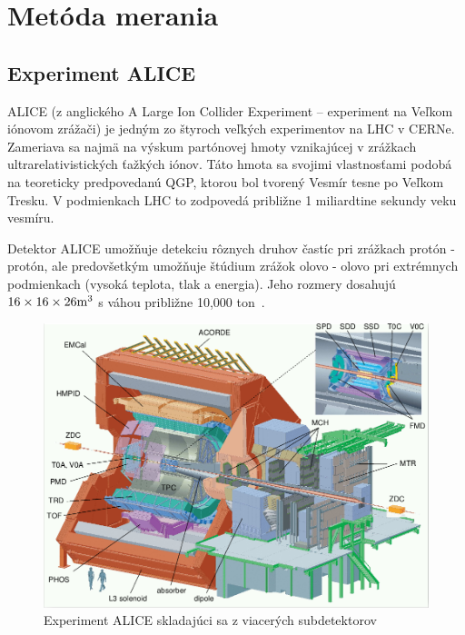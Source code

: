 \documentclass[thesismargins, thesislinespacing]{rnthesis}
\begin{document}
\chapter{Metóda merania}

\section{Experiment ALICE}

ALICE (z anglického A Large Ion Collider Experiment – experiment na Veľkom iónovom zrážači) je jedným zo štyroch veľkých experimentov na LHC v CERNe. Zameriava sa najmä na výskum partónovej hmoty vznikajúcej v zrážkach ultrarelativistických ťažkých iónov. Táto hmota sa svojimi vlastnosťami podobá na teoreticky predpovedanú QGP, ktorou bol tvorený Vesmír tesne po Veľkom Tresku. V podmienkach LHC to zodpovedá približne 1 miliardtine sekundy veku vesmíru.

Detektor  ALICE umožňuje detekciu rôznych druhov častíc pri zrážkach protón - protón, ale predovšetkým umožňuje štúdium zrážok olovo - olovo pri extrémnych podmienkach (vysoká teplota, tlak a energia). Jeho rozmery dosahujú $16\times 16\times26 \rm{m^3}$ s váhou približne 10,000 ton~\cite{alice}. 

\begin{figure}[hbtp!]
	\begin{center}
		\includegraphics[width=\textwidth]{./Obrazky_praca/ALICE.png}
		\caption{Experiment ALICE skladajúci sa z viacerých subdetektorov~\cite{aliceDetektor}}
		\label{ALICE}
	\end{center}
\end{figure}
\end{document}
